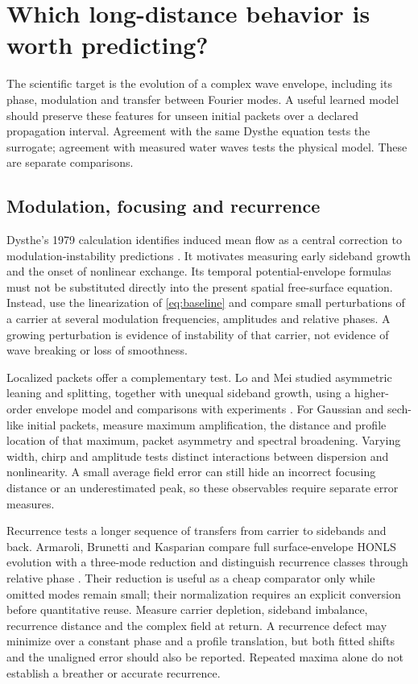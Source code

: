 \section{Which long-distance behavior is worth predicting?}
\label{sec:physics}

The scientific target is the evolution of a complex wave envelope, including
its phase, modulation and transfer between Fourier modes. A useful learned
model should preserve these features for unseen initial packets over a
declared propagation interval. Agreement with the same Dysthe equation tests
the surrogate; agreement with measured water waves tests the physical model.
These are separate comparisons.

\subsection{Modulation, focusing and recurrence}

Dysthe's 1979 calculation identifies induced mean flow as a central
correction to modulation-instability predictions \cite{dysthe1979}.
It motivates measuring early sideband growth and the onset of nonlinear
exchange. Its temporal potential-envelope formulas must not be substituted
directly into the present spatial free-surface equation. Instead, use the
linearization of \eqref{eq:baseline} and compare small perturbations of a
carrier at several modulation frequencies, amplitudes and relative phases.
A growing perturbation is evidence of instability of that carrier, not
evidence of wave breaking or loss of smoothness.

Localized packets offer a complementary test. Lo and Mei studied asymmetric
leaning and splitting, together with unequal sideband growth, using a
higher-order envelope model and comparisons with experiments \cite{lomei}.
For Gaussian and sech-like initial packets, measure maximum amplification,
the distance and profile location of that maximum, packet asymmetry and
spectral broadening. Varying width, chirp and amplitude tests distinct
interactions between dispersion and nonlinearity. A small average field
error can still hide an incorrect focusing distance or an underestimated
peak, so these observables require separate error measures.

Recurrence tests a longer sequence of transfers from carrier to sidebands
and back. Armaroli, Brunetti and Kasparian compare full surface-envelope
HONLS evolution with a three-mode reduction and distinguish recurrence
classes through relative phase \cite{recurrence}. Their reduction is useful
as a cheap comparator only while omitted modes remain small; their
normalization requires an explicit conversion before quantitative reuse.
Measure carrier depletion, sideband imbalance, recurrence distance and
the complex field at return. A recurrence defect may minimize over a constant
phase and a profile translation, but both fitted shifts and the unaligned
error should also be reported. Repeated maxima alone do not establish a
breather or accurate recurrence.

